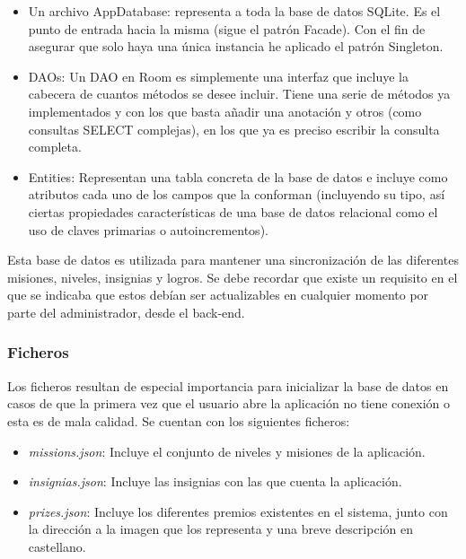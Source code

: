 \documentclass[twoside]{report}
\begin{document}
\begin{itemize}

\item Un archivo AppDatabase: representa a toda la base de datos SQLite. Es el punto de entrada hacia la misma (sigue el patrón Facade). Con el fin de asegurar que solo haya una única instancia he aplicado el patrón Singleton.
\item DAOs: Un DAO en Room es simplemente una interfaz que incluye la cabecera de cuantos métodos se desee incluir. Tiene una serie de métodos ya implementados y con los que basta añadir una anotación y otros (como consultas SELECT complejas), en los que ya es preciso escribir la consulta completa.
\item Entities: Representan una tabla concreta de la base de datos e incluye como atributos cada uno de los campos que la conforman (incluyendo su tipo, así ciertas propiedades características de una base de datos relacional como el uso de claves primarias o autoincrementos).
\end{itemize}

Esta base de datos es utilizada para mantener una sincronización de las diferentes misiones, niveles, insignias y logros. Se debe recordar que existe un requisito en el que se indicaba que estos debían ser actualizables en cualquier momento por parte del administrador, desde el back-end.

\subsubsection{Ficheros}

Los ficheros resultan de especial importancia para inicializar la base de datos en casos de que la primera vez que el usuario abre la aplicación no tiene conexión o esta es de mala calidad. Se cuentan con los siguientes ficheros:

\begin{itemize}
\item \textit{missions.json}: Incluye el conjunto de niveles y misiones de la aplicación. 

\item \textit{insignias.json}: Incluye las insignias con las que cuenta la aplicación.

\item \textit{prizes.json}: Incluye los diferentes premios existentes en el sistema, junto con la dirección a la imagen que los representa y una breve descripción en castellano.

\end{itemize}
\end{document}

